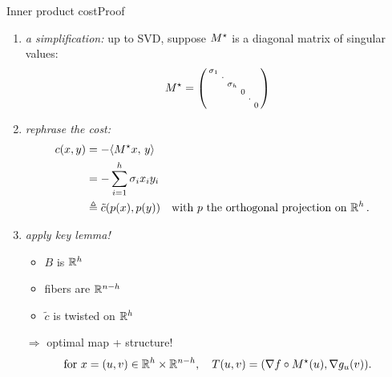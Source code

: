 \documentclass[9pt,xcolor={dvipsnames}]{beamer}
\begin{document}
\begin{frame}{Inner product cost}{Proof}
    \begin{enumerate}
        \item \emph{a simplification:} up to SVD, suppose $M^\star$ is a diagonal matrix of singular values:
        $$M^\star=\left(\begin{smallmatrix}
            \sigma_1 & & & & &\\
            & \cdot & & & &\\
            &  & \sigma_h & & &\\
            &  &  & 0 & &\\
            &  &  & & \cdot & \\
            &  &  & &  & 0 \\
        \end{smallmatrix}\right)$$
        \item \emph{rephrase the cost:}
            \begin{align*}
                c(x, y)&=-\langle M^\star x,\,y\rangle\\
                &=-\sum_{i=1}^h \sigma_i x_i y_i\\
                &\triangleq \tilde c(p( x), p( y)) && \text{with } p\text{ the orthogonal projection on }\mathbb{R}^h\,.
            \end{align*}
        \item \emph{apply key lemma!}
            \begin{itemize}
                \item $B$ is $\mathbb{R}^h$
                \item fibers are $\mathbb{R}^{n-h}$
                \item $\tilde c$ is {twisted} on $\mathbb{R}^h$
            \end{itemize}
            \vfill
        \item[$\Rightarrow$] optimal map + structure!
            $$\text{for }x=(u,v)\in\mathbb{R}^h\times\mathbb{R}^{n-h},\quad T(u,v)=(\nabla f\circ M^\star(u), \nabla g_{u}(v)).$$
            \hfill\square
    \end{enumerate}
    \end{frame}
\end{document}
